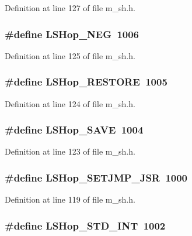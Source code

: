 Definition at line 127 of file m\_\-sh.h.
\subsubsection{\setlength{\rightskip}{0pt plus 5cm}\#define LSHop\_\-NEG~1006}\label{m__sh_8h_7eb99b8118f5117bdc4c3a318c47bdbf}




Definition at line 125 of file m\_\-sh.h.
\subsubsection{\setlength{\rightskip}{0pt plus 5cm}\#define LSHop\_\-RESTORE~1005}\label{m__sh_8h_81c60fccfde4546737908eba94ef6d03}




Definition at line 124 of file m\_\-sh.h.
\subsubsection{\setlength{\rightskip}{0pt plus 5cm}\#define LSHop\_\-SAVE~1004}\label{m__sh_8h_f706e0100a8cdf2e782658ac1d04c3c6}




Definition at line 123 of file m\_\-sh.h.
\subsubsection{\setlength{\rightskip}{0pt plus 5cm}\#define LSHop\_\-SETJMP\_\-JSR~1000}\label{m__sh_8h_20b4f3dc546e639a88851937d9b51fc2}




Definition at line 119 of file m\_\-sh.h.
\subsubsection{\setlength{\rightskip}{0pt plus 5cm}\#define LSHop\_\-STD\_\-INT~1002}\label{m__sh_8h_c28652c27198957f8a9eeaa4fc05a99d}





